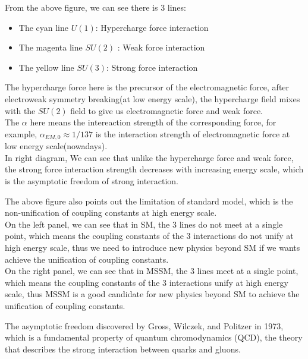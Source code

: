 \begin{extra}
    From the above figure, we can see there is 3 lines:
    \begin{itemize}
        \item The cyan line $U(1)$: Hypercharge force interaction
        \item The magenta line $SU(2)$ : Weak force interaction
        \item The yellow line $SU(3)$: Strong force interaction
    \end{itemize}
    The hypercharge force here is the precursor of the electromagnetic force, after electroweak symmetry breaking(at low energy scale), the hypercharge field mixes with the $SU(2)$ field to give us electromagnetic force and weak force. \\

    The $\alpha$ here means the intereaction strength of the corresponding force, for example, $\alpha_{EM,0} \approx 1/137$ is the interaction strength of electromagnetic force at low energy scale(nowadays). \\

    In right diagram, We can see that unlike the hypercharge force and weak force, the strong force interaction strength decreases with increasing energy scale, which is the asymptotic freedom of strong interaction. 
\end{extra}

\bigskip\noindent
\begin{extra}
    The above figure also points out the limitation of standard model, which is the non-unification of coupling constants at high energy scale. \\

    On the left panel, we can see that in SM, the 3 lines do not meet at a single point, which means the coupling constants of the 3 interactions do not unify at high energy scale, thus we need to introduce new physics beyond SM if we wants achieve the unification of coupling constants. \\

    On the right panel, we can see that in MSSM, the 3 lines meet at a single point, which means the coupling constants of the 3 interactions unify at high energy scale, thus MSSM is a good candidate for new physics beyond SM to achieve the unification of coupling constants. 
\end{extra}

\bigskip\noindent
\begin{extra}
    The asymptotic freedom discovered by Gross, Wilczek, and Politzer in 1973, which is a fundamental property of quantum chromodynamics (QCD), the theory that describes the strong interaction between quarks and gluons. 
\end{extra}

